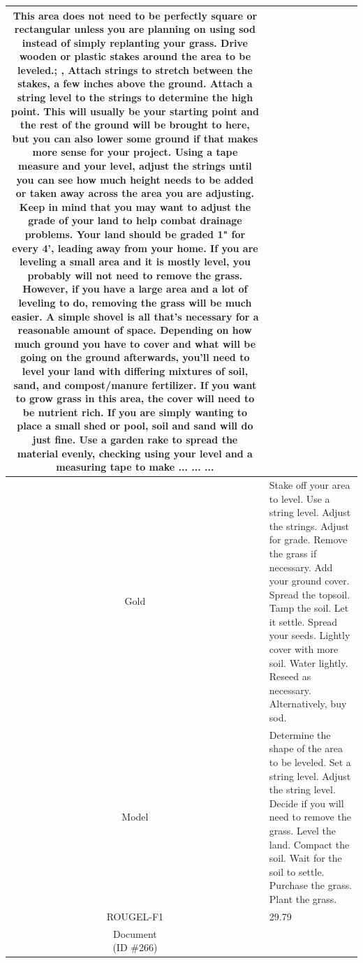 \begin{table}[bth!]
\begin{tabular}{c|p{}}
This area does not need to be perfectly square or rectangular unless you are planning on using sod instead of simply replanting your grass. Drive wooden or plastic stakes around the area to be leveled.; , Attach strings to stretch between the stakes, a few inches above the ground. Attach a string level to the strings to determine the high point. This will usually be your starting point and the rest of the ground will be brought to here, but you can also lower some ground if that makes more sense for your project. Using a tape measure and your level, adjust the strings until you can see how much height needs to be added or taken away across the area you are adjusting. Keep in mind that you may want to adjust the grade of your land to help combat drainage problems. Your land should be graded 1" for every 4', leading away from your home. If you are leveling a small area and it is mostly level, you probably will not need to remove the grass. However, if you have a large area and a lot of leveling to do, removing the grass will be much easier. A simple shovel is all that's necessary for a reasonable amount of space. Depending on how much ground you have to cover and what will be going on the ground afterwards, you'll need to level your land with differing mixtures of soil, sand, and compost/manure fertilizer. If you want to grow grass in this area, the cover will need to be nutrient rich. If you are simply wanting to place a small shed or pool, soil and sand will do just fine. Use a garden rake to spread the material evenly, checking using your level and a measuring tape to make ... ... ... 
\\ \hline
Gold & 
Stake off your area to level. Use a string level. Adjust the strings. Adjust for grade. Remove the grass if necessary. Add your ground cover. Spread the topsoil. Tamp the soil. Let it settle. Spread your seeds. Lightly cover with more soil. Water lightly. Reseed as necessary. Alternatively, buy sod.
\\ \hline
Model & 
Determine the shape of the area to be leveled. Set a string level. Adjust the string level. Decide if you will need to remove the grass. Level the land. Compact the soil. Wait for the soil to settle. Purchase the grass. Plant the grass.
\\ \hline
ROUGEL-F1 & 
29.79
\\ \hline
\makecell{Document\\(ID \#266)} & 

\end{tabular}
\end{table}
